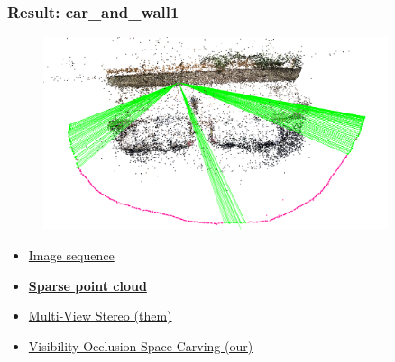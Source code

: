 \documentclass{beamer}
\begin{document}
\begin{frame}
  \frametitle{Result: car\_and\_wall1}
  \begin{figure}[htb!]
   \centering
   \includegraphics[width=0.9\textwidth]{img/car_and_wall1_sparse}  %
  \end{figure}
  \begin{itemize}
    \item \href{run:./vid/01-result1-seq.mp4}{Image sequence} \\
    \item \href{run:./vid/02-result1-sparse.mp4}{\textbf{Sparse point cloud}} \\
    \item \href{run:./vid/03-result1-mvs.mp4}{Multi-View Stereo (them)} \\
    \item \href{run:./vid/04-result1-visocc.mp4}{Visibility-Occlusion Space Carving (our)} \\
  \end{itemize}
\end{frame}
\end{document}
